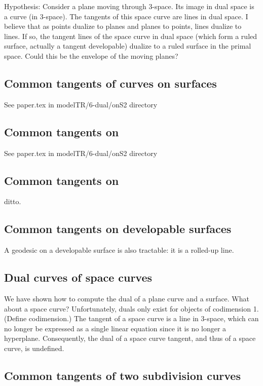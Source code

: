 \documentclass[12pt]{article}
\begin{document}
Hypothesis: Consider a plane moving through 3-space.
	Its image in dual space is a curve (in 3-space).
	The tangents of this space curve are lines in dual space.
	I believe that as points dualize to planes and planes to points,
	lines dualize to lines.
	If so, the tangent lines of the space curve in dual space
	(which form a ruled surface, actually a tangent developable)
	dualize to a ruled surface in the primal space.
	Could this be the envelope of the moving planes?

\subsection{Common tangents of curves on surfaces}

See paper.tex in modelTR/6-dual/onS2 directory

\subsection{Common tangents on }

See paper.tex in modelTR/6-dual/onS2 directory

\subsection{Common tangents on }

ditto.

\subsection{Common tangents on developable surfaces}

A geodesic on a developable surface is also tractable:
it is a rolled-up line.


\subsection{Dual curves of space curves}

We have shown how to compute the dual of a plane curve and a surface.
What about a space curve?
Unfortunately, duals only exist for objects of codimension 1.
(Define codimension.)
The tangent of a space curve is a line in 3-space, which can no longer
be expressed as a single linear equation since it is no longer a hyperplane.
Consequently, the dual of a space curve tangent, and thus of a space curve,
is undefined.

\subsection{Common tangents of two subdivision curves}
\end{document}
